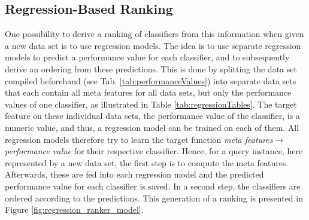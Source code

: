 \subsection{Regression-Based Ranking}
One possibility to derive a ranking of classifiers from this information when given a new data set is to use regression models. The idea is to use separate regression models to predict a performance value for each classifier, and to subsequently derive an ordering from these predictions. This is done by splitting the data set compiled beforehand (see Tab. \ref{tab:performanceValues}) into separate data sets that each contain all meta features for all data sets, but only the performance values of one classifier, as illustrated in Table \ref{tab:regressionTables}. The target feature on these individual data sets, the performance value of the classifier, is a numeric value, and thus, a regression model can be trained on each of them. All regression models therefore try to learn the target function \textit{meta features}$\rightarrow$\textit{performance value} for their respective classifier. Hence, for a query instance, here represented by a new data set, the first step is to compute the meta features. Afterwards, these are fed into each regression model and the predicted performance value for each classifier is saved. In a second step, the classifiers are ordered according to the predictions. This generation of a ranking is presented in Figure \ref{fig:regression_ranker_model}.

